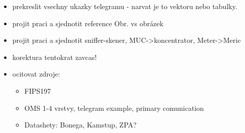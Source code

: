 \begin{itemize}
	\item prekreslit vsechny ukazky telegramu - narvat je to vektoru nebo tabulky.
	\item projit praci a sjednotit reference Obr. vs obrázek
	\item projit praci a sjednotit sniffer-skener, MUC->koncentrator, Meter->Meric
	\item korektura tentokrat zavcas!
	\item ocitovat zdroje:
		\begin{itemize}
			\item FIPS197
			\item OMS 1-4 vrstvy, telegram example, primary comunication
			\item Datashety: Bonega, Kamstup, ZPA?
		\end{itemize}
\end{itemize}
